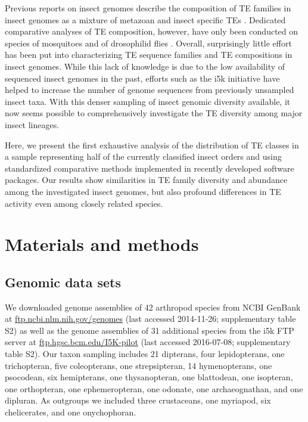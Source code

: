 Previous reports on insect genomes describe the composition of TE
families in insect genomes as a mixture of metazoan and insect specific
TEs \citep{Feschotte2007}. Dedicated comparative analyses of TE
composition, however, have only been conducted on species of mosquitoes
\citep{Neafsey2015} and of drosophilid flies \citep{Sessegolo2016}.
Overall, surprisingly little effort has been put into characterizing TE
sequence families and TE compositions in insect genomes. While this lack
of knowledge is due to the low availability of sequenced insect genomes
in the past, efforts such as the i5k initiative \citep{Robinson2011}
have helped to increase the number of genome sequences from previously
unsampled insect taxa. With this denser sampling of insect genomic
diversity available, it now seems possible to comprehensively
investigate the TE diversity among major insect lineages.

Here, we present the first exhaustive analysis of the distribution of TE
classes in a sample representing half of the currently classified insect
orders and using standardized comparative methods implemented in
recently developed software packages.  Our results show similarities in
TE family diversity and abundance among the investigated insect genomes,
but also profound differences in TE activity even among closely related
species.

\section{Materials and methods}\label{materials-and-methods}

\subsection{Genomic data sets}\label{genomic-data-sets}

We downloaded genome assemblies of 42 arthropod species from NCBI
GenBank at \url{ftp.ncbi.nlm.nih.gov/genomes} (last accessed 2014-11-26;
supplementary table S2) as well as the genome assemblies of 31
additional species from the i5k FTP server at
\href{ftp://ftp.hgsc.bcm.edu:/I5K-pilot/}{ftp.hgsc.bcm.edu/I5K-pilot}
(last accessed 2016-07-08; supplementary table S2). Our taxon sampling
includes 21 dipterans, four lepidopterans, one trichopteran, five
coleopterans, one strepsipteran, 14 hymenopterans, one psocodean, six
hemipterans, one thysanopteran, one blattodean, one isopteran, one
orthopteran, one ephemeropteran, one odonate, one archaeognathan, and
one dipluran. As outgroups we included three crustaceans, one myriapod,
six chelicerates, and one onychophoran.


